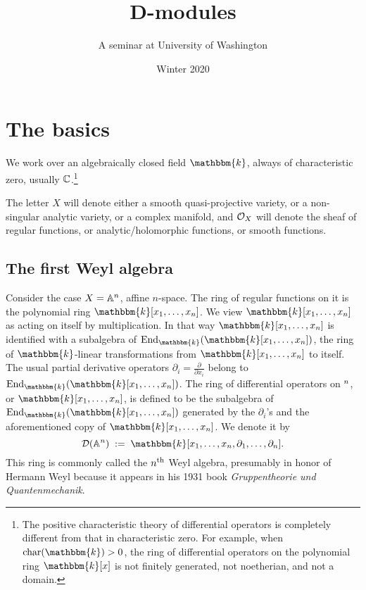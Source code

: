 \documentclass[12pt]{article}
\newcommand{\Bbbk}{\mathbbm{k}}
\let\AA\relax
\newcommand{\AA}{\bbA}
\begin{document}
\title{D-modules}
\author{A seminar at University of Washington}
\date{Winter 2020}
\maketitle

\section{The basics}

We work over an algebraically closed field $\Bbbk$, always of characteristic zero, usually 
$\mathbb{C}$.\footnote{The positive characteristic theory of differential operators  
is completely different from that in characteristic zero. For example, when ${\rm char}(\Bbbk)>0$, the ring of differential operators on
the polynomial ring $\Bbbk[x]$ is not finitely generated, not noetherian, and not a domain.}

The letter $X$ will denote either a smooth quasi-projective variety, or a non-singular analytic variety, or a complex manifold, and 
$\mathcal{O}_X$ will denote the sheaf of regular functions, or analytic/holomorphic functions, or smooth functions.


\subsection{The first Weyl algebra}
Consider  the case $X=\mathbb{A}^n$, affine $n$-space. The ring of regular functions on it is the polynomial ring $\Bbbk[x_1,\ldots,x_n]$. 
We view $\Bbbk[x_1,\ldots,x_n]$ as acting on itself by multiplication. In that way $\Bbbk[x_1,\ldots,x_n]$ is identified with a subalgebra
of $\End_\Bbbk(\Bbbk[x_1,\ldots,x_n])$, the ring of $\Bbbk$-linear transformations from $\Bbbk[x_1,\ldots,x_n]$ to itself. 
The usual partial derivative operators $\partial_i=\frac{\partial}{\partial x_i}$ belong to $\End_\Bbbk(\Bbbk[x_1,\ldots,x_n])$. The {\sf
ring of differential operators} on $\AA^n$, or $\Bbbk[x_1,\ldots,x_n]$, is defined to be the subalgebra of $\End_\Bbbk(\Bbbk[x_1,\ldots,x_n])$
generated by the $\partial_i$'s and the aforementioned copy of $\Bbbk[x_1,\ldots,x_n]$. We denote it by
$$
\calD(\bbA^n) \; :=\; \Bbbk[x_1,\ldots,x_n,\partial_1,\ldots,\partial_n].
$$
This ring is commonly called the {\sf $n^{\rm th}$ Weyl algebra}, presumably in honor of Hermann Weyl because it appears in his 1931 
book {\it Gruppentheorie und Quantenmechanik}. 
\end{document}
